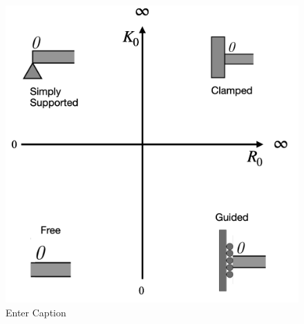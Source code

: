 \begin{figure}
    \centering
    \includegraphics[width=1\linewidth]{img/boundary-conditions-plot.png}
    \caption{Enter Caption}
    \label{fig:boundary-conditions-plot}
\end{figure}

